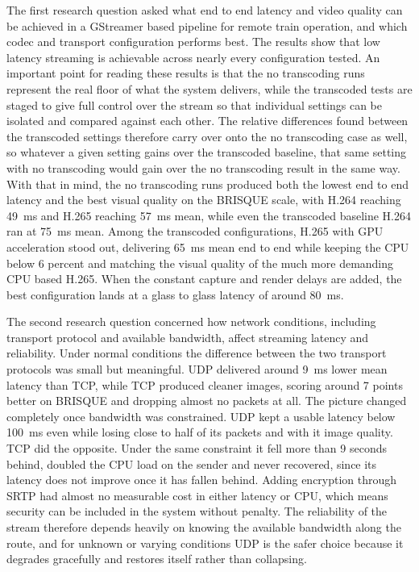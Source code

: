 The first research question asked what end to end latency and video quality can be achieved in a GStreamer based pipeline for remote train operation, and which codec and transport configuration performs best. The results show that low latency streaming is achievable across nearly every configuration tested. An important point for reading these results is that the no transcoding runs represent the real floor of what the system delivers, while the transcoded tests are staged to give full control over the stream so that individual settings can be isolated and compared against each other. The relative differences found between the transcoded settings therefore carry over onto the no transcoding case as well, so whatever a given setting gains over the transcoded baseline, that same setting with no transcoding would gain over the no transcoding result in the same way. With that in mind, the no transcoding runs produced both the lowest end to end latency and the best visual quality on the BRISQUE scale, with H.264 reaching 49~ms and H.265 reaching 57~ms mean, while even the transcoded baseline H.264 ran at 75~ms mean. Among the transcoded configurations, H.265 with GPU acceleration stood out, delivering 65~ms mean end to end while keeping the CPU below 6 percent and matching the visual quality of the much more demanding CPU based H.265. When the constant capture and render delays are added, the best configuration lands at a glass to glass latency of around 80~ms.

The second research question concerned how network conditions, including transport protocol and available bandwidth, affect streaming latency and reliability. Under normal conditions the difference between the two transport protocols was small but meaningful. UDP delivered around 9~ms lower mean latency than TCP, while TCP produced cleaner images, scoring around 7 points better on BRISQUE and dropping almost no packets at all. The picture changed completely once bandwidth was constrained. UDP kept a usable latency below 100~ms even while losing close to half of its packets and with it image quality. TCP did the opposite. Under the same constraint it fell more than 9 seconds behind, doubled the CPU load on the sender and never recovered, since its latency does not improve once it has fallen behind. Adding encryption through SRTP had almost no measurable cost in either latency or CPU, which means security can be included in the system without penalty. The reliability of the stream therefore depends heavily on knowing the available bandwidth along the route, and for unknown or varying conditions UDP is the safer choice because it degrades gracefully and restores itself rather than collapsing.

